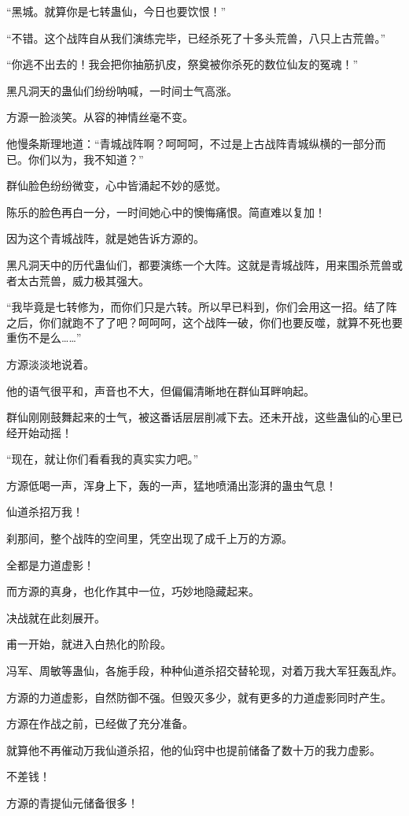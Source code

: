 \begin{this_body}
“黑城。就算你是七转蛊仙，今日也要饮恨！”

“不错。这个战阵自从我们演练完毕，已经杀死了十多头荒兽，八只上古荒兽。”

“你逃不出去的！我会把你抽筋扒皮，祭奠被你杀死的数位仙友的冤魂！”

黑凡洞天的蛊仙们纷纷呐喊，一时间士气高涨。

方源一脸淡笑。从容的神情丝毫不变。

他慢条斯理地道：“青城战阵啊？呵呵呵，不过是上古战阵青城纵横的一部分而已。你们以为，我不知道？”

群仙脸色纷纷微变，心中皆涌起不妙的感觉。

陈乐的脸色再白一分，一时间她心中的懊悔痛恨。简直难以复加！

因为这个青城战阵，就是她告诉方源的。

黑凡洞天中的历代蛊仙们，都要演练一个大阵。这就是青城战阵，用来围杀荒兽或者太古荒兽，威力极其强大。

“我毕竟是七转修为，而你们只是六转。所以早已料到，你们会用这一招。结了阵之后，你们就跑不了了吧？呵呵呵，这个战阵一破，你们也要反噬，就算不死也要重伤不是么……”

方源淡淡地说着。

他的语气很平和，声音也不大，但偏偏清晰地在群仙耳畔响起。

群仙刚刚鼓舞起来的士气，被这番话层层削减下去。还未开战，这些蛊仙的心里已经开始动摇！

“现在，就让你们看看我的真实实力吧。”

方源低喝一声，浑身上下，轰的一声，猛地喷涌出澎湃的蛊虫气息！

仙道杀招万我！

刹那间，整个战阵的空间里，凭空出现了成千上万的方源。

全都是力道虚影！

而方源的真身，也化作其中一位，巧妙地隐藏起来。

决战就在此刻展开。

甫一开始，就进入白热化的阶段。

冯军、周敏等蛊仙，各施手段，种种仙道杀招交替轮现，对着万我大军狂轰乱炸。

方源的力道虚影，自然防御不强。但毁灭多少，就有更多的力道虚影同时产生。

方源在作战之前，已经做了充分准备。

就算他不再催动万我仙道杀招，他的仙窍中也提前储备了数十万的我力虚影。

不差钱！

方源的青提仙元储备很多！


\end{this_body}
